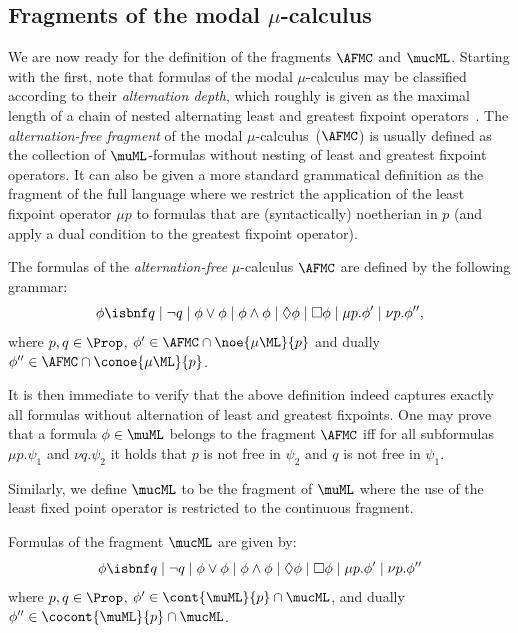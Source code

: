 \subsection{Fragments of the modal $\mu$-calculus}

We are now ready for the definition of the fragments $\AFMC$ and 
$\mucML$.
Starting with the first, note that
formulas of the modal $\mu$-calculus may be classified according to their
\emph{alternation depth}, which roughly is given as the maximal length of
a chain of nested alternating least and greatest fixpoint operators~\cite{Niwinski86}.
The \emph{alternation-free fragment} of the modal $\mu$-calculus~($\AFMC$) is 
usually defined as the collection of $\muML$-formulas without nesting of least
and greatest fixpoint operators. 
It can also be given a more standard grammatical definition as the fragment of 
the full language where we restrict the application of the least fixpoint 
operator $\mu p$ to formulas that are (syntactically) noetherian in $p$ (and 
apply a dual condition to the greatest fixpoint operator).

\begin{definition}
The formulas of the \emph{alternation-free} $\mu$-calculus $\AFMC$ are defined 
by the following grammar:
\begin{equation*}
   \phi \isbnf  
      q \mid \neg q  
   \mid \phi\lor\phi \mid \phi\land\phi 
      \mid \Diamond \phi
       \mid \Box \phi
   \mid \mu p. \phi'    
   \mid \nu p. \phi'',
\end{equation*} 
where $p,q \in \Prop$, $\phi' \in \AFMC \cap \noe{\mu\ML}{p}$
and dually $\phi'' \in \AFMC \cap \conoe{\mu\ML}{p}$.
\end{definition}

It is then immediate to verify that the above definition indeed captures exactly
all formulas without alternation of least and greatest fixpoints.
One may prove that a formula $\phi \in \muML$ belongs to the fragment $\AFMC$ 
iff for all subformulas $\mu p.\psi_1$ and $\nu q.\psi_2$ it holds that $p$ is
not free in $\psi_2$ and $q$ is not free in $\psi_1$.

Similarly, we define $\mucML$ to be the fragment of $\muML$ where the use of the
least fixed point operator is restricted to the continuous fragment. 

\begin{definition}
Formulas of the fragment $\mucML$ are given by:%
\begin{equation*}
   \phi \isbnf  q \mid \lnot q
    \mid \phi \lor \phi
        \mid \phi \land \phi
    \mid \Diamond \phi
     \mid \Box \phi \mid
    \mu p.\phi' 
    \mid \nu p.\phi''
    \end{equation*}
%
where $p,q \in \Prop$,  $\phi' \in \cont{\muML}{p} \cap \mucML$, and dually 
$\phi'' \in \cocont{\muML}{p} \cap \mucML$.
\end{definition}

